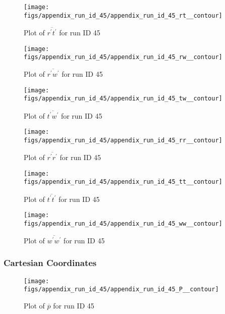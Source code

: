 \begin{figure}[H]
\centering
\texttt{[image: figs/appendix\_run\_id\_45/appendix\_run\_id\_45\_rt\_\_contour]}
\caption{Plot of $\overline{r^\prime t^\prime}$ for run ID 45}
\label{fig:appendix_run_id_45_rt__contour}
\end{figure}


\begin{figure}[H]
\centering
\texttt{[image: figs/appendix\_run\_id\_45/appendix\_run\_id\_45\_rw\_\_contour]}
\caption{Plot of $\overline{r^\prime w^\prime}$ for run ID 45}
\label{fig:appendix_run_id_45_rw__contour}
\end{figure}


\begin{figure}[H]
\centering
\texttt{[image: figs/appendix\_run\_id\_45/appendix\_run\_id\_45\_tw\_\_contour]}
\caption{Plot of $\overline{t^\prime w^\prime}$ for run ID 45}
\label{fig:appendix_run_id_45_tw__contour}
\end{figure}


\begin{figure}[H]
\centering
\texttt{[image: figs/appendix\_run\_id\_45/appendix\_run\_id\_45\_rr\_\_contour]}
\caption{Plot of $\overline{r^\prime r^\prime}$ for run ID 45}
\label{fig:appendix_run_id_45_rr__contour}
\end{figure}


\begin{figure}[H]
\centering
\texttt{[image: figs/appendix\_run\_id\_45/appendix\_run\_id\_45\_tt\_\_contour]}
\caption{Plot of $\overline{t^\prime t^\prime}$ for run ID 45}
\label{fig:appendix_run_id_45_tt__contour}
\end{figure}


\begin{figure}[H]
\centering
\texttt{[image: figs/appendix\_run\_id\_45/appendix\_run\_id\_45\_ww\_\_contour]}
\caption{Plot of $\overline{w^\prime w^\prime}$ for run ID 45}
\label{fig:appendix_run_id_45_ww__contour}
\end{figure}


\subsubsection{Cartesian Coordinates}
\begin{figure}[H]
\centering
\texttt{[image: figs/appendix\_run\_id\_45/appendix\_run\_id\_45\_P\_\_contour]}
\caption{Plot of $\overline{p}$ for run ID 45}
\label{fig:appendix_run_id_45_P__contour}
\end{figure}


